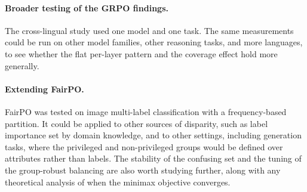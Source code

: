 \paragraph{Broader testing of the GRPO findings.}
The cross-lingual study used one model and one task. The same measurements could be
run on other model families, other reasoning tasks, and more languages, to see
whether the flat per-layer pattern and the coverage effect hold more generally.

\paragraph{Extending FairPO.}
FairPO was tested on image multi-label classification with a frequency-based
partition. It could be applied to other sources of disparity, such as label
importance set by domain knowledge, and to other settings, including generation
tasks, where the privileged and non-privileged groups would be defined over
attributes rather than labels. The stability of the confusing set and the tuning of
the group-robust balancing are also worth studying further, along with any
theoretical analysis of when the minimax objective converges.

